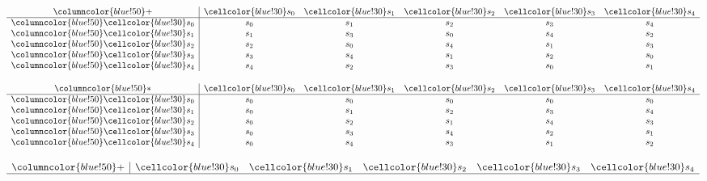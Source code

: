 \documentclass{article}
\begin{document}
\begin{center}
\begin{minipage}{0.23\textwidth}
    \centering
    \small{}
    \renewcommand{\arraystretch}{1} 
    \[
    \begin{array}{>{\columncolor{blue!50}}c|ccccc}
    + & \cellcolor{blue!30}s_0 & \cellcolor{blue!30}s_1 & \cellcolor{blue!30}s_2 & \cellcolor{blue!30}s_3 & \cellcolor{blue!30}s_4 \\ \hline
    \cellcolor{blue!30}s_0 & s_0 & s_1 & s_2 & s_3 & s_4 \\
    \cellcolor{blue!30}s_1 & s_1 & s_3 & s_0 & s_4 & s_2 \\
    \cellcolor{blue!30}s_2 & s_2 & s_0 & s_4 & s_1 & s_3 \\
    \cellcolor{blue!30}s_3 & s_3 & s_4 & s_1 & s_2 & s_0 \\
    \cellcolor{blue!30}s_4 & s_4 & s_2 & s_3 & s_0 & s_1 \\
    \end{array}
    \]
\end{minipage}%
\hfill
\begin{minipage}{0.23\textwidth}
    \centering
    \small{}
    \renewcommand{\arraystretch}{1} 
    \[
    \begin{array}{>{\columncolor{blue!50}}c|ccccc}
    * & \cellcolor{blue!30}s_0 & \cellcolor{blue!30}s_1 & \cellcolor{blue!30}s_2 & \cellcolor{blue!30}s_3 & \cellcolor{blue!30}s_4 \\ \hline
    \cellcolor{blue!30}s_0 & s_0 & s_0 & s_0 & s_0 & s_0 \\
    \cellcolor{blue!30}s_1 & s_0 & s_1 & s_2 & s_3 & s_4 \\
    \cellcolor{blue!30}s_2 & s_0 & s_2 & s_1 & s_4 & s_3 \\
    \cellcolor{blue!30}s_3 & s_0 & s_3 & s_4 & s_2 & s_1 \\
    \cellcolor{blue!30}s_4 & s_0 & s_4 & s_3 & s_1 & s_2 \\
    \end{array}
    \]
\end{minipage}%
\hspace{0.5cm}
\begin{minipage}{0.23\textwidth}
    \centering
    \small{}
    \renewcommand{\arraystretch}{1} 
    \[
    \begin{array}{>{\columncolor{blue!50}}c|ccccc}
    + & \cellcolor{blue!30}s_0 & \cellcolor{blue!30}s_1 & \cellcolor{blue!30}s_2 & \cellcolor{blue!30}s_3 & \cellcolor{blue!30}s_4 \\ \hline

\end{array}\]
\end{minipage}
\end{center}
\end{document}
